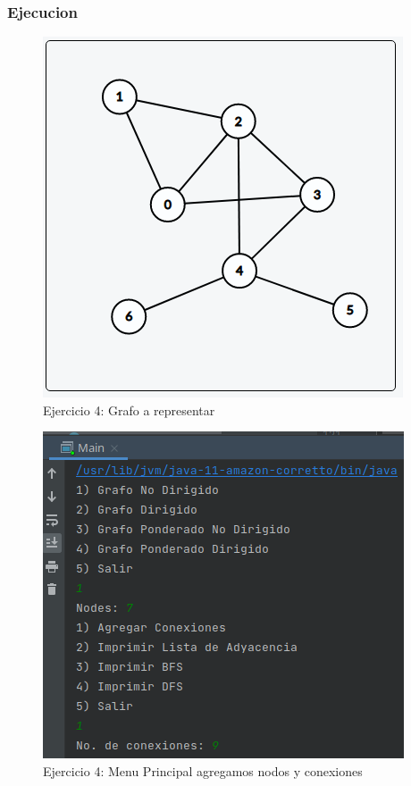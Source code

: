 \documentclass{article}
\begin{document}
			\subsubsection{Ejecucion}
			
			\begin{figure}[H]
				\centering
				\includegraphics[scale= 0.6]{images/e4graph1.png}
				\caption*{Ejercicio 4: Grafo a representar}
			\end{figure}
			
			\begin{figure}[H]
				\centering
				\includegraphics[scale= 0.75]{images/e41.png}
				\caption*{Ejercicio 4: Menu Principal agregamos nodos y conexiones}
			\end{figure}
			
\end{document}
